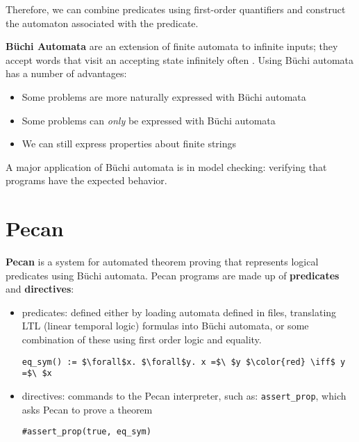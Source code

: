 \documentclass[10pt,usenames,dvipsnames]{article}
\begin{document}
Therefore, we can combine predicates using first-order quantifiers and construct the automaton associated with the predicate.

\textbf{B\"uchi Automata} are an extension of finite automata to infinite inputs; they accept words that visit an accepting state infinitely often \cite{aut_theory}. 
Using B\"uchi automata has a number of advantages:
\begin{itemize}
        \item Some problems are more naturally expressed with B\"uchi automata
        \item Some problems can \emph{only} be expressed with B\"uchi automata
        \item We can still express properties about finite strings
\end{itemize}
A major application of B\"uchi automata is in model checking: verifying that programs have the expected behavior.

\section{Pecan}

\textbf{Pecan} is a system for automated theorem proving that represents logical predicates using B\"uchi automata.
Pecan programs are made up of \textbf{predicates} and \textbf{directives}:

\begin{itemize}
    \item predicates: defined either by loading automata defined in files, translating LTL (linear temporal logic) formulas into B\"uchi automata, or some combination of these using first order logic and equality.

\begin{lstlisting}[language=pecan, basicstyle=\normalsize\ttfamily, mathescape=true, frame=single]
eq_sym() := $\forall$x. $\forall$y. x =$\ $y $\color{red} \iff$ y =$\ $x
\end{lstlisting}

    \item directives: commands to the Pecan interpreter, such as: \texttt{assert\_prop}, which asks Pecan to prove a theorem
    
\begin{lstlisting}[language=pecan, basicstyle=\normalsize\ttfamily, mathescape=true, frame=single]
#assert_prop(true, eq_sym)
\end{lstlisting}

\end{itemize}
\end{document}
